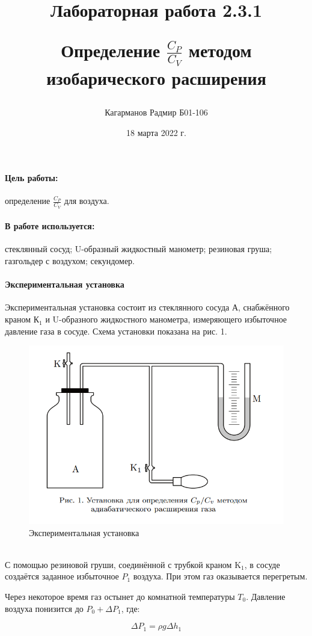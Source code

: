 \documentclass[a4paper,12pt]{article}
\title{Лабораторная работа 2.3.1 

Определение $\frac{C_P}{C_V}$ методом изобарического расширения}
\author{Кагарманов Радмир Б01-106}
\date{18 марта 2022 г.}
\begin{document}
\maketitle

\newpage

\paragraph{Цель работы:}определение $\frac{C_P}{C_V}$ для воздуха.
\paragraph{В работе используется:}стеклянный сосуд; U-образный жидкостный манометр; резиновая груша; газгольдер с воздухом; секундомер.
\paragraph{Экспериментальная установка \\}
Экспериментальная установка состоит из стеклянного сосуда А, снабжённого краном $\text{К}_1$ и U-образного жидкостного манометра, измеряющего избыточное давление газа в сосуде. Схема установки показана на рис. 1.

\begin{figure}[h]
\centering
\includegraphics[width=0.7\linewidth]{установка.png}
\caption{Экспериментальная установка}
\label{fig:mpr}
\end{figure}
\\

С помощью резиновой груши, соединённой с трубкой краном $\text{K}_1$, в сосуде создаётся заданное избыточное $P_1$ воздуха. При этом газ оказывается перегретым.

Через некоторое время газ остынет до комнатной температуры $T_0$. Давление воздуха понизится до $P_0 + \Delta P_1$, где:

\begin{equation}
    \Delta P_1 = \rho g \Delta h_1
\end{equation}
\end{document}
